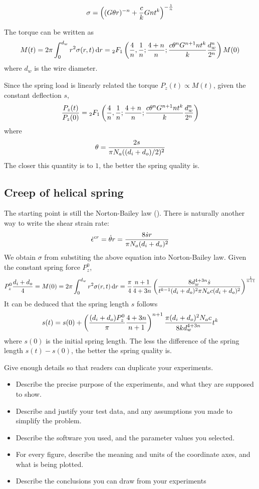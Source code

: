 \documentclass[10pt]{article}
\begin{document}
\[
\sigma = \left( (G\theta r)^{-n} + {c\over k} Gnt^k \right)^{-{1\over n}}
\]

The torque can be written as
\[
M(t) = 2\pi \int_0^{d_w} r^2 \sigma(r,t)\,\mathrm{d} r ={}_{2}F_1 \left( {4\over n},{1\over n};{4+n\over n};{c\theta^n G^{n+1} n t^k\over k} {d_w^n\over 2^n}\right) M(0)
\]
where $d_w$ is the wire diameter.

Since the spring load is linearly related the torque $P_z(t)\propto M(t)$, given the constant deflection $s$,
\[
{P_z(t)\over P_z(0)} = {}_{2}F_1 \left( {4\over n},{1\over n};{4+n\over n};{c\theta^n G^{n+1} n t^k\over k} {d_w^n\over 2^n}\right)
\]
where
\[
\theta = {2s\over \pi N_a ((d_i+d_o)/2)^2}
\]
The closer this quantity is to $1$, the better the spring quality is.

\subsection{Creep of helical spring}
The starting point is still the Norton-Bailey law (\label{eq:N-B}). There is naturally another way to write the shear strain rate:
\[
\dot{\epsilon}^{cr} = \dot{\theta} r = {8\dot{s} r\over \pi N_a (d_i+d_o)^2}
\]
We obtain $\sigma$ from substiting the above equation into Norton-Bailey law. Given the constant spring force $P_z^0$,
\[
P_z^0{d_i+d_o\over 4}=M(0)=2\pi\int_0^{d_w} r^2 \sigma(r,t)\,\mathrm{d} r
={\pi\over 4}{n+1\over 4+3n}\left( {8d_w^{4+3n}\dot{s} \over t^{k-1} (d_i+d_o)^2 \pi N_a c (d_i+d_o)^2} \right)^{{1\over n+1}}
\]
It can be deduced that the spring length $s$ follows
\[
s(t) = s(0) + \left( {(d_i+d_o)P_z^0\over \pi}{4+3n\over n+1} \right)^{n+1} {\pi (d_i+d_o)^2 N_a c\over 8kd_w^{4+3n}} t^k
\]
where $s(0)$ is the initial spring length. The less the difference of the spring length $s(t)-s(0)$, the better the spring quality is.

Give enough details so that readers can duplicate your experiments.

\begin{itemize}
\item Describe the precise purpose of the experiments, and what they 
are supposed to show.

\item Describe and justify your test data, and any assumptions you made to 
simplify the problem.

\item Describe the software you used, and the 
parameter values you selected.

\item 
For every figure, describe the meaning and units of the coordinate axes, 
and what is being plotted.

\item Describe the conclusions you can draw from your experiments
\end{itemize}
\end{document}
